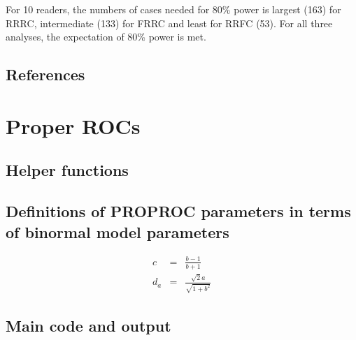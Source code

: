 \documentclass[
]{book}
\begin{document}
For 10 readers, the numbers of cases needed for 80\% power is largest (163) for RRRC, intermediate (133) for FRRC and least for RRFC (53). For all three analyses, the expectation of 80\% power is met.

\hypertarget{references-3}{%
\section{References}\label{references-3}}

\hypertarget{ProperROCs}{%
\chapter{Proper ROCs}\label{ProperROCs}}

\hypertarget{helper-functions}{%
\section{Helper functions}\label{helper-functions}}

\hypertarget{definitions-of-proproc-parameters-in-terms-of-binormal-model-parameters}{%
\section{Definitions of PROPROC parameters in terms of binormal model parameters}\label{definitions-of-proproc-parameters-in-terms-of-binormal-model-parameters}}

\begin{eqnarray*}
c & = & \frac{b-1}{b+1}\\
d_a & = & \frac{\sqrt{2}a}{\sqrt{1+{b^{2}}}} 
\end{eqnarray*}

\hypertarget{main-code-and-output}{%
\section{Main code and output}\label{main-code-and-output}}
\end{document}
